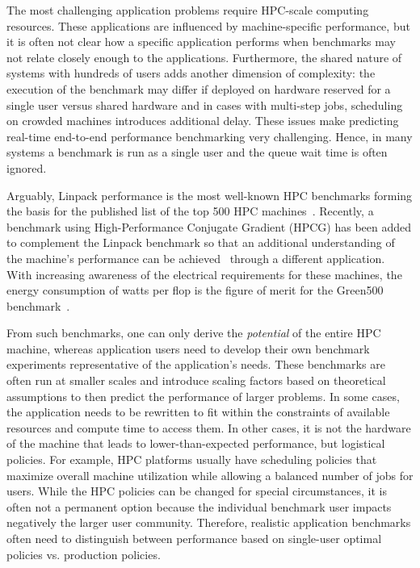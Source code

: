 \documentclass[sigconf]{acmart}
\begin{document}
The most challenging application problems require HPC-scale computing resources. These applications are influenced by machine-specific performance, but it is often not clear how a specific application performs when benchmarks may not relate closely enough to the applications. Furthermore, the shared nature of systems with hundreds of users  adds another dimension of complexity: the execution of the benchmark may differ if deployed on hardware reserved for a single user versus shared hardware and in cases with multi-step jobs, scheduling on crowded machines introduces additional delay. These issues make predicting real-time end-to-end performance benchmarking very challenging. Hence, in many systems a benchmark is run as a single user and the queue wait time is often ignored.

Arguably, Linpack performance is the most well-known HPC benchmarks forming the basis for the published list of the top 500 HPC machines~\citep{www-top500}. Recently, a benchmark using High-Performance Conjugate Gradient (HPCG) has been added to complement the Linpack benchmark so that an additional understanding of the machine's performance can be achieved~\citep{www-top500} through a different application. With increasing awareness of the electrical requirements for these machines, the energy consumption of watts per flop is the figure of merit for the Green500 benchmark~\citep{green500}.

From such benchmarks, one can only derive the {\em potential} of the entire HPC machine, whereas application users need to develop their own benchmark experiments representative of the application's needs. These benchmarks are often run at smaller scales and introduce scaling factors based on theoretical assumptions to then predict the performance of larger problems. In some cases, the application needs to be rewritten to fit within the constraints of available resources and compute time to access them. In other cases, it is not the hardware of the machine that leads to lower-than-expected performance, but logistical policies. For example, HPC platforms usually have scheduling policies that maximize overall machine utilization while allowing a balanced number of jobs for users. While the HPC policies can be changed for special circumstances, it is often not a permanent option because the individual benchmark user impacts negatively the larger user community. Therefore, realistic application benchmarks often need to distinguish between performance based on single-user optimal policies vs. production policies. 
\end{document}
